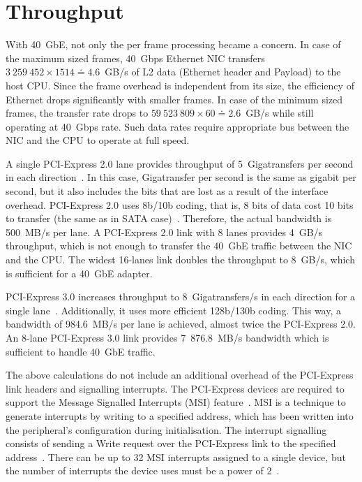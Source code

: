 
\section{Throughput}\label{sec:40gbe-throughput}
With 40~GbE, not only the per frame processing became a concern.
In case of the maximum sized frames,
40~Gbps Ethernet NIC transfers $3~259~452 \times 1514 \doteq 4.6$~GB/s of L2 data
(Ethernet header and Payload) to the host CPU.
Since the frame overhead is independent from its size,
the efficiency of Ethernet drops significantly with smaller frames.
In case of the minimum sized frames, the transfer rate drops to $59~523~809 \times 60 \doteq 2.6$~GB/s
while still operating at 40~Gbps rate.
Such data rates require appropriate bus between the NIC and the CPU to operate at full speed.

A single PCI-Express 2.0 lane provides throughput of 5~Gigatransfers per second in each direction~\cite{pcie-specification}.
In this case, Gigatransfer per second is the same as gigabit per second,
but it also includes the bits that are lost as a result of the interface overhead.
PCI-Express 2.0 uses 8b/10b coding, that is, 8 bits of data cost 10 bits to transfer (the same as in SATA case)~\cite{pcie-bandwidth}.
Therefore, the actual bandwidth is 500~MB/s per lane.
A PCI-Express 2.0 link with 8 lanes provides 4~GB/s throughput,
which is not enough to transfer the 40~GbE traffic between the NIC and the CPU.
The widest 16-lanes link doubles the throughput to 8~GB/s, which is sufficient for a 40~GbE adapter.

PCI-Express 3.0 increases throughput to 8~Gigatransfers/s in each direction for a single lane~\cite{pcie-specification}.
Additionally, it uses more efficient 128b/130b coding.
This way, a bandwidth of 984.6~MB/s per lane is achieved, almost twice the PCI-Express 2.0.
An 8-lane PCI-Express 3.0 link provides 7~876.8~MB/s bandwidth which is sufficient to handle 40~GbE traffic.

The above calculations do not include an additional overhead of the PCI-Express link headers
and signalling interrupts.
The PCI-Express devices are required to support the Message Signalled Interrupts (MSI) feature~\cite{pcie-specification}.
MSI is a technique to generate interrupts by writing to a specified address,
which has been written into the peripheral's configuration during initialisation.
The interrupt signalling consists of sending a Write request over the PCI-Express link
to the specified address~\cite{pcie-tutorial-1}.
There can be up to 32 MSI interrupts assigned to a single device,
but the number of interrupts the device uses must be a power of 2~\cite{msi-driver-guide}.

